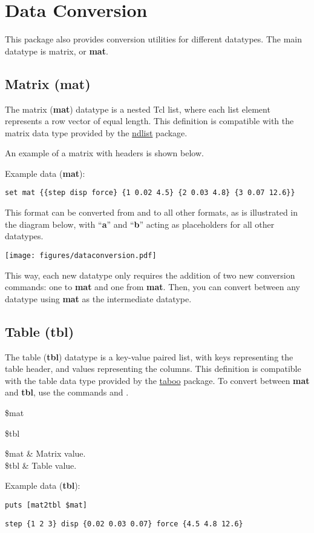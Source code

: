 \documentclass{article}
\begin{document}
\clearpage
\section{Data Conversion}
This package also provides conversion utilities for different datatypes. 
The main datatype is matrix, or \textbf{mat}. 
\subsection{Matrix (mat)}
The matrix (\textbf{mat}) datatype is a nested Tcl list, where each list element represents a row vector of equal length.
This definition is compatible with the matrix data type provided by the \textcolor{blue}{\href{https://github.com/ambaker1/ndlist}{ndlist}} package. 

An example of a matrix with headers is shown below. 
\begin{example}{Example data (\textbf{mat}):}
\begin{lstlisting}
set mat {{step disp force} {1 0.02 4.5} {2 0.03 4.8} {3 0.07 12.6}}
\end{lstlisting}
\end{example}
This format can be converted from and to all other formats, as is illustrated in the diagram below, with ``\textbf{a}'' and ``\textbf{b}'' acting as placeholders for all other datatypes.
\begin{center}
\texttt{[image: figures/dataconversion.pdf]}
\end{center}
This way, each new datatype only requires the addition of two new conversion commands: one to \textbf{mat} and one from \textbf{mat}.
Then, you can convert between any datatype using \textbf{mat} as the intermediate datatype.
\clearpage
\subsection{Table (tbl)}
The table (\textbf{tbl}) datatype is a key-value paired list, with keys representing the table header, and values representing the columns.
This definition is compatible with the table data type provided by the \textcolor{blue}{\href{https://github.com/ambaker1/taboo}{taboo}} package.
To convert between \textbf{mat} and \textbf{tbl}, use the commands  and .
\begin{syntax}
 \$mat
\end{syntax}
\begin{syntax}
 \$tbl
\end{syntax}
\begin{args}
\$mat & Matrix value. \\
\$tbl & Table value. 
\end{args}
\begin{example}{Example data (\textbf{tbl}):}
\begin{lstlisting}
puts [mat2tbl $mat]
\end{lstlisting}
\tcblower
\begin{lstlisting}
step {1 2 3} disp {0.02 0.03 0.07} force {4.5 4.8 12.6}
\end{lstlisting}
\end{example}
\clearpage
\end{document}
